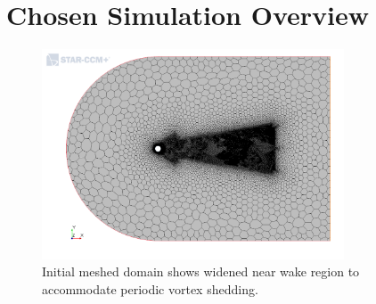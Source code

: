 \documentclass[10pt,english]{article}
\begin{document}
\section{Chosen Simulation Overview}

 \begin{figure}[h]
\centering
\includegraphics[trim={0.0cm 0cm 0.0cm 0cm},clip,width=0.8\textwidth]{cylinder_2_016_MeshScene2.png}
\vspace{-5pt}
\caption{Initial meshed domain shows widened near wake region to accommodate periodic vortex shedding. }
\label{f:cylinder_2_016_MeshScene2}
\end{figure}
\end{document}
